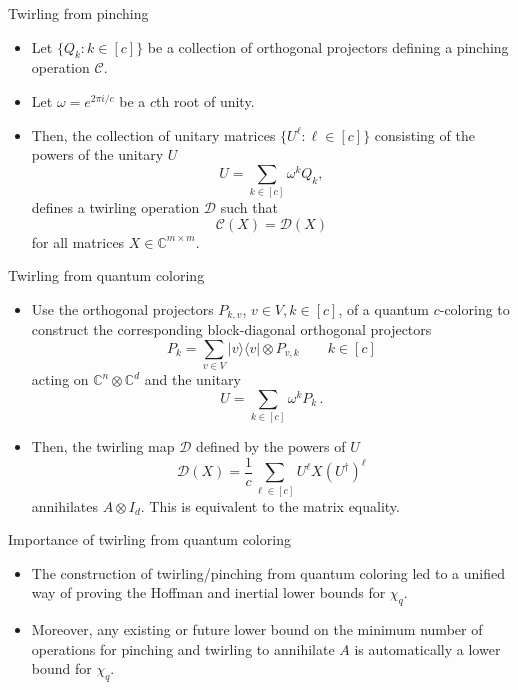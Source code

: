 \documentclass{beamer}
\newcommand{\C}{\mathbb{C}}
\newcommand{\cC}{\mathcal{C}}
\newcommand{\cD}{\mathcal{D}}
\renewcommand{\>}{\rangle}
\newcommand{\<}{\langle}
\begin{document}
%

\begin{frame}{Twirling from pinching}

\begin{itemize}
\item Let $\{Q_k : k\in [c]\}$ be a collection of orthogonal projectors defining a pinching operation $\cC$.

\item Let $\omega = e^{2 \pi i /c}$ be a $c$th root of unity.

\item Then, the collection of unitary matrices $\{ U^\ell : \ell \in [c]\}$ consisting of the powers of the unitary $U$
\[
U = \sum_{k\in [c]} \omega^{k} Q_k,
\]
defines a twirling operation $\cD$ such that
\[
\cC(X) = \cD(X) 
\]
for all  matrices $X\in\C^{m\times m}$.

\end{itemize}

\end{frame}

%

\begin{frame}{Twirling from quantum coloring}

\begin{itemize}

\item Use the orthogonal projectors $P_{k,v}$, $v\in V, k \in [c]$, of a quantum $c$-coloring
%
to construct the corresponding block-diagonal orthogonal projectors 
\[
P_k = \sum_{v\in V} |v\>\<v| \otimes P_{v,k} \quad \quad k \in [c]
\]
acting on $\C^n\otimes \C^d$ and the unitary
\[
U = \sum_{k \in [c]} \omega^{k} P_k\,. 
\]

\item Then, the twirling map $\cD$ defined by the powers of $U$
\[
\cD(X) = \frac{1}{c} \sum_{\ell\in [c]} U^\ell X (U^\dagger)^\ell
\]
annihilates $A\otimes I_d$. This is equivalent to the matrix equality.
\end{itemize}

\end{frame}

%

\begin{frame}{Importance of twirling from quantum coloring}
\begin{itemize}
\item The construction of twirling/pinching from quantum coloring led to a unified way of proving the Hoffman and inertial lower bounds for $\chi_q$.

\medskip
\item Moreover, any existing or future lower bound on the minimum number of operations for pinching and twirling to annihilate $A$ is automatically a lower bound for $\chi_q$.
\end{itemize}
\end{frame}
\end{document}
